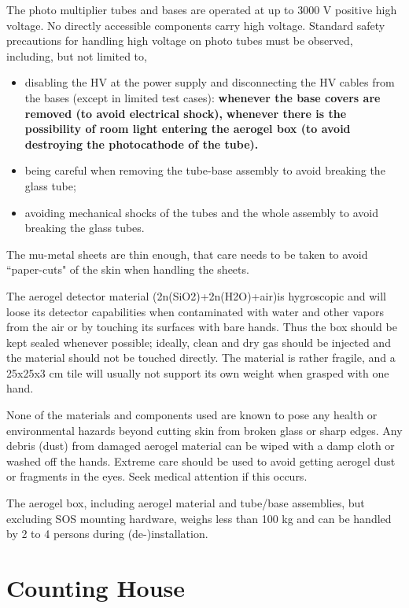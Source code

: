 The photo multiplier tubes and bases are operated at up to 3000 V
positive high voltage. No directly accessible components carry high
voltage. Standard safety precautions for handling high voltage on
photo tubes must be observed, including, but not limited to,
\begin{itemize}
\item{disabling the HV at the power supply and disconnecting the HV
cables from the bases (except in limited test cases):
{\bf whenever the base covers are removed (to avoid electrical shock),}
{\bf whenever there is the possibility of room light entering the
aerogel box (to avoid destroying the photocathode of the tube).}}
\item{being careful when removing the tube-base assembly to avoid breaking
the glass tube;}
\item{avoiding mechanical shocks of the tubes and the whole assembly to
avoid breaking the glass tubes.}
\end{itemize}

The mu-metal sheets are thin enough, that care needs to be taken to
avoid ``paper-cuts" of the skin when handling the sheets.

The aerogel detector material (2n(SiO2)+2n(H2O)+air)is hygroscopic
and will loose its detector capabilities when contaminated with water
and other vapors from the air or by touching its surfaces with bare
hands. Thus the box should be kept sealed whenever possible; ideally,
clean and dry gas should be injected and the material should not be
touched directly. The material is rather fragile, and a 25x25x3 cm
tile will usually not support its own weight when grasped with one
hand. 

None of the materials and components used are known to pose any
health or environmental hazards beyond cutting skin from broken glass
or sharp edges.  Any debris (dust) from damaged aerogel material can be wiped
with a damp cloth or washed off the hands.  Extreme care should be
used to avoid getting aerogel dust or fragments in the eyes.  Seek
medical attention if this occurs.

The aerogel box, including aerogel material and tube/base assemblies,
but excluding SOS mounting hardware, weighs less than 100 kg and
can be handled by 2 to 4 persons during (de-)installation.

\section{Counting House}

